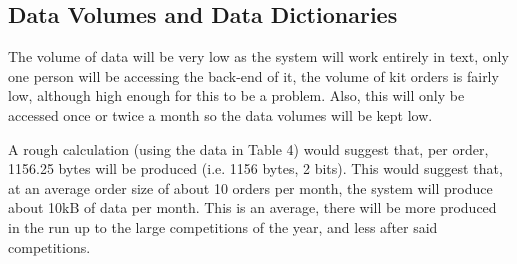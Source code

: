 \documentclass[
11pt, %
a4paper, %
oneside, %
headinclude,footinclude, %
BCOR5mm, %
]{scrartcl}
\begin{document}
\subsection{Data Volumes and Data Dictionaries}
The volume of data will be very low as the system will work entirely in text, only one person will be accessing the back-end of it, the volume of kit orders is fairly low, although high enough for this to be a problem. Also, this will only be accessed once or twice a month so the data volumes will be kept low. \par A rough calculation (using the data in Table 4) would suggest that, per order, 1156.25 bytes will be produced (i.e. 1156 bytes, 2 bits). This would suggest that, at an average order size of about 10 orders per month, the system will produce about 10kB of data per month. This is an average, there will be more produced in the run up to the large competitions of the year, and less after said competitions. 
\begin{table}[ht]
	\small
	\caption{Current Data Dictionary}
	\centering
\end{table}
\end{document}
